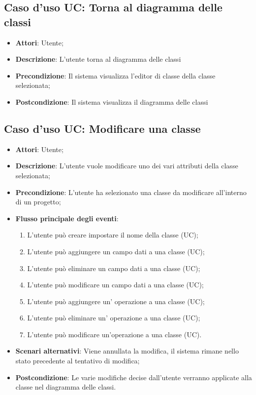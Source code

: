 \documentclass[../AnalisiDeiRequisiti.tex]{subfiles}
\begin{document}
			\subsection{Caso d'uso UC: Torna al diagramma delle classi}	
			\begin{itemize}
				\item \textbf{Attori}: Utente;
				\item \textbf{Descrizione}: L'utente torna al diagramma delle classi
				\item \textbf{Precondizione}: Il sistema visualizza l'editor di classe della classe selezionata;
				\item \textbf{Postcondizione}: Il sistema visualizza il diagramma delle classi
			\end{itemize}		
				
			\subsection{Caso d'uso UC: Modificare una classe}
			\begin{itemize}
				\item \textbf{Attori}: Utente;
				
				\item \textbf{Descrizione}: L'utente vuole modificare uno dei vari attributi della classe selezionata;
				
				\item \textbf{Precondizione}: L'utente ha selezionato una classe da modificare all'interno di un progetto;
				
				\item \textbf{Flusso principale degli eventi}:
				\begin{enumerate}
					\item L'utente può creare impostare il nome della classe (UC);
					\item L'utente può aggiungere un campo dati a una classe (UC);
					\item L'utente può eliminare un campo dati a una classe (UC);
					\item L'utente può modificare un campo dati a una classe (UC);
					\item L'utente può aggiungere un' operazione a una classe (UC);
					\item L'utente può eliminare un' operazione a una classe (UC);
					\item L'utente può modificare un'operazione a una classe (UC).
				\end{enumerate}
				
				\item \textbf{Scenari alternativi}: Viene annullata la modifica, il sistema 
				rimane nello stato precedente al tentativo di modifica;
				
				
				\item \textbf{Postcondizione}: Le varie modifiche decise dall'utente verranno applicate alla classe nel diagramma delle classi.
			\end{itemize}
			
\end{document}
